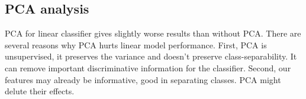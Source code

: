 \documentclass[conference]{IEEEtran}
\begin{document}
\subsection{PCA analysis}


\begin{table}[h]
\centering
\caption{Linear model performance with PCA-reduced features.}
\label{tab:linear_model_pca}
\end{table}


PCA for linear classifier gives slightly worse results than without PCA.
There are several reasons why PCA hurts linear model performance. 
First, PCA is unsupervised, it preserves the variance and doesn't preserve class-separability.
It can remove important discriminative information for the classifier.
Second, our features may already be informative, good in separating classes.
PCA might delute their effects.

\end{document}
